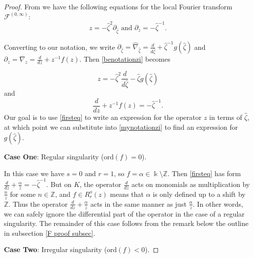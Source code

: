 \documentclass[11pt]{amsart}
\theoremstyle{plain}
\theoremstyle{definition}
\theoremstyle{remark}
\def\z{\hat{\zeta}}
\begin{document}
\begin{proof} From \cite[Proposition 3.7]{bloch} we have the following equations for the local Fourier transform $\mathcal{F}^{(0,\infty)}$:
\begin{equation}\label{benotationzi}
    z=-\z^2\partial_{\z} \text{ and } \partial_z=-\z^{-1}.
\end{equation}

Converting to our notation, we write $\partial_{\z}=\hat{\nabla}_{\z}=\frac{d}{d\z}+\z^{-1}g(\z)$ and $\partial_z=\nabla_{z}=\frac{d}{dz}+z^{-1}f(z)$. Then \eqref{benotationzi} becomes

\begin{equation}\label{mynotationzi}
    z=-\z^2\frac{d}{d\z}-\z g(\z)
\end{equation}
 and
\begin{equation}\label{firsteq}
    \frac{d}{dz}+z^{-1}f(z)=-\z^{-1}.
\end{equation}
Our goal is to use \eqref{firsteq} to write an expression for the operator $z$ in terms of $\z$, at which point we can substitute into \eqref{mynotationzi} to find an expression for $g(\z)$.

\noindent \textbf{Case One}: Regular singularity (ord$(f)=0$).

In this case we have $s=0$ and $r=1$, so $f=\alpha\in \Bbbk\setminus\mathbb{Z}$.  Then \eqref{firsteq} has form $\frac{d}{dz}+\frac{\alpha}{z}=-\z^{-1}$.  But on $K$, the operator $\frac{d}{dz}$ acts on monomials as multiplication by $\frac{n}{z}$ for some $n\in\mathbb{Z}$, and $f\in R^o_r(z)$ means that $\alpha$ is only defined up to a shift by $\mathbb{Z}$. Thus the operator $\frac{d}{dz}+\frac{\alpha}{z}$ acts in the same manner as just $\frac{\alpha}{z}$.  In other words, we can safely ignore the differential part of the operator in the case of a regular singularity.  The remainder of this case follows from the remark below the outline in subsection \ref{F proof subsec}.

\noindent \textbf{Case Two}: Irregular singularity (ord$(f)<0$).


\end{proof}
\end{document}
